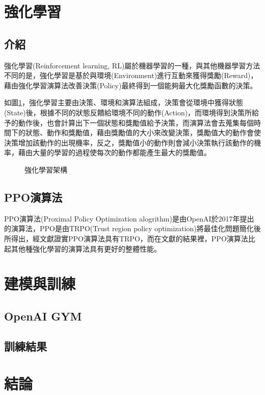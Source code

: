 \documentclass[a4paper, onecolumn, 11pt, AutoFakeBold]{article}
\newcommand{\texttwelve}{\fontsize{12}{12}\selectfont}
\newcommand{\figref}[1]{圖\ref{#1}}
\begin{document}
\begin{multicols*}{2}
\smallskip
\section{強化學習}
\subsection{介紹}
\par
強化學習(Reinforcement learning, RL)屬於機器學習的一種，與其他機器學習方法不同的是，強化學習是基於與環境(Environment)進行互動來獲得獎勵(Reward)，藉由強化學習演算法改善決策(Policy)最終得到一個能夠最大化獎勵函數的決策。
\par
如\figref{fig:RL_architecture}，強化學習主要由決策、環境和演算法組成，決策會從環境中獲得狀態(State)後，根據不同的狀態反饋給環境不同的動作(Action)，而環境得到決策所給予的動作後，也會計算出下一個狀態和獎勵值給予決策，而演算法會去蒐集每個時間下的狀態、動作和獎勵值，藉由獎勵值的大小來改變決策，獎勵值大的動作會使決策增加該動作的出現機率，反之，獎勵值小的動作則會減小決策執行該動作的機率，藉由大量的學習的過程使每次的動作都能產生最大的獎勵值。
\begin{figure}[H]
    \centering
    
    \caption{強化學習架構}
    \label{fig:RL_architecture}
\end{figure}

\smallskip
\subsection{PPO演算法}
\par
PPO演算法(Proximal Policy Optimization alogrithm)是由OpenAI於2017年提出的演算法，PPO是由TRPO(Trust region policy optimization)將最佳化問題簡化後所得出，經文獻\cite{PPO_algorithms}證實PPO演算法具有TRPO，而在文獻\cite{PPO_algorithms}的結果裡，PPO演算法比起其他種強化學習的演算法具有更好的整體性能。

\smallskip
\section{建模與訓練}
\subsection{OpenAI GYM}

\smallskip
\subsection{訓練結果}

\smallskip
\section{結論}

\smallskip
\titleformat{\section}{\bfseries\texttwelve}{\xCJKnumber{\thesection}、}{0em}{}
\printbibliography[title=\texttwelve{參考文獻}]

\end{multicols*}
\end{document}
